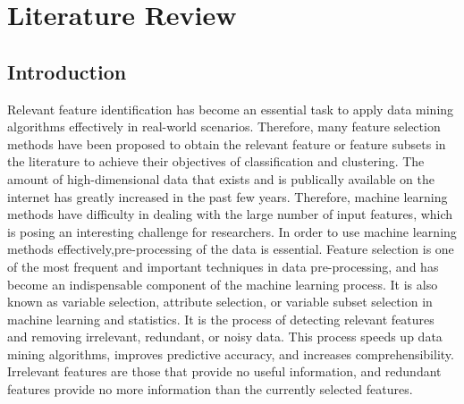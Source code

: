 \documentclass[document.tex]{subfiles}
\begin{document}
\chapter{Literature Review}

\section{Introduction}
\noindent Relevant feature identification has become an essential task to apply data mining algorithms effectively in real-world scenarios. Therefore, many feature selection methods have been proposed to obtain the relevant feature or feature subsets in the literature to achieve their objectives of classification and clustering.
The amount of high-dimensional data that exists and is publically available on the internet has greatly increased in the past few years. Therefore, machine learning methods have difficulty in dealing with the large number of input features, which is posing an interesting challenge for researchers. In order to use machine learning methods effectively,pre-processing of the data is essential. Feature selection is one of the most frequent and important techniques in data pre-processing, and has become an indispensable component of the machine learning process. It is also known as variable selection, attribute selection, or variable subset selection in machine learning and statistics. It is the process of detecting relevant features and removing irrelevant, redundant, or noisy data. This process speeds up data mining algorithms, improves predictive accuracy, and increases
comprehensibility. Irrelevant features are those that provide no useful information, and
redundant features provide no more information than the currently selected features.
\end{document}
